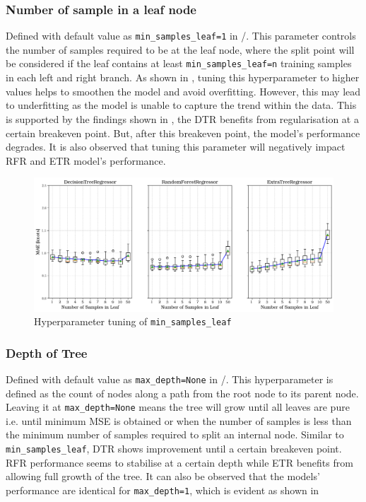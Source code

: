\subsubsection*{Number of sample in a leaf node}\label{sec:min_samples_leaf}

Defined with default value as {\tt min\_samples\_leaf=1} in \scikit/. This parameter controls the number of samples required to be at the leaf node, where the split point will be considered if the leaf contains at least {\tt min\_samples\_leaf=n} training samples in each left and right branch. As shown in , tuning this hyperparameter to higher values helps to smoothen the model and avoid overfitting. However, this may lead to underfitting as the model is unable to capture the trend within the data. This is supported by the findings shown in , the DTR benefits from regularisation at a certain breakeven point. But, after this breakeven point, the model's performance degrades. It is also observed that tuning this parameter will negatively impact RFR and ETR model's performance. 

\begin{figure}[h]
    \centering
        \includegraphics[width=.85\textwidth]{02_figures/hpo_min_samples_leaf_mae.png}
        \caption{Hyperparameter tuning of {\tt min\_samples\_leaf}}
        \label{fig:hpo_min_samples_leaf}
\end{figure}

\subsubsection*{Depth of Tree}\label{sec:max_depth}

Defined with default value as {\tt max\_depth=None} in \scikit/. This hyperparameter is defined as the count of nodes along a path from the root node to its parent node. Leaving it at {\tt max\_depth=None} means the tree will grow until all leaves are pure i.e. until minimum MSE is obtained or when the number of samples is less than the minimum number of samples required to split an internal node. Similar to {\tt min\_samples\_leaf}, DTR shows improvement until a certain breakeven point. RFR performance seems to stabilise at a certain depth while ETR benefits from allowing full growth of the tree. It can also be observed that the models' performance are identical for {\tt max\_depth=1}, which is evident as shown in   

